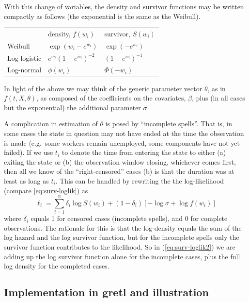 With this change of variables, the density and survivor functions may
be written compactly as follows (the exponential is the same as the
Weibull).

\begin{center}
\setlength\tabcolsep{1.5em}
\begin{tabular}{lll}
 & density, $f(w_i)$ & survivor, $S(w_i)$ \\ [4pt]
Weibull & 
$\exp\left(w_i - e^{w_i}\right)$ & $\exp(-e^{w_i})$
\\ [4pt]
Log-logistic & 
$e^{w_i} \left(1 + e^{w_i}\right)^{-2}$ 
& $\left(1 + e^{w_i}\right)^{-1}$ \\ [1ex]
Log-normal & $\phi(w_i)$ & $\Phi(-w_i)$
\end{tabular}
\end{center}

In light of the above we may think of the generic parameter vector
$\theta$, as in $f(t, X, \theta)$, as composed of the coefficients on
the covariates, $\beta$, plus (in all cases but the exponential) the
additional parameter $\sigma$.

A complication in estimation of $\theta$ is posed by ``incomplete
spells''. That is, in some cases the state in question may not have
ended at the time the observation is made (e.g.\ some workers remain
unemployed, some components have not yet failed).  If we use $t_i$ to
denote the time from entering the state to either (a) exiting the
state or (b) the observation window closing, whichever comes first,
then all we know of the ``right-censored'' cases (b) is that the
duration was at least as long as $t_i$. This can be handled by
rewriting the the log-likelihood (compare \ref{eq:surv-loglik}) as
\begin{equation}
\label{eq:surv-loglik2}
\ell_i = \sum_{i=1}^n \delta_i\log S\left(w_i\right)
+ \left(1-\delta_i\right) 
\left[-\log\sigma + \log f\left(w_i\right)\right]
\end{equation}
where $\delta_i$ equals 1 for censored cases (incomplete spells), and
0 for complete observations. The rationale for this is that the
log-density equals the sum of the log hazard and the log survivor
function, but for the incomplete spells only the survivor function
contributes to the likelihood. So in (\ref{eq:surv-loglik2}) we are
adding up the log survivor function alone for the incomplete cases,
plus the full log density for the completed cases.

\subsection{Implementation in gretl and illustration}


